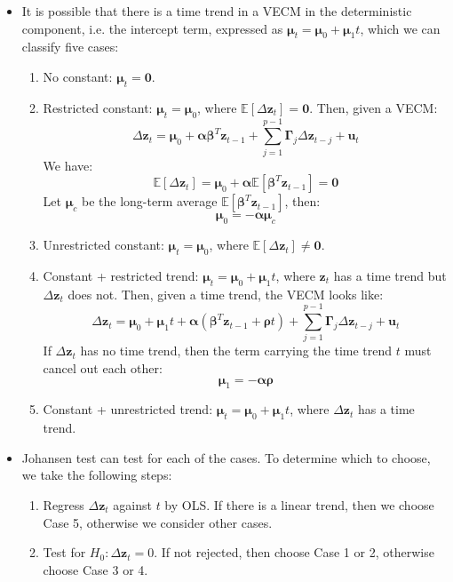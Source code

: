\documentclass[notitlepage]{article}
\begin{document}
\begin{itemize}
    \item It is possible that there is a time trend in a VECM in the deterministic component, i.e. the intercept term, expressed as \(\boldsymbol{\mu}_t = \boldsymbol{\mu}_0 + \boldsymbol{\mu}_1 t\), which we can classify five cases:
    \begin{enumerate}
        \item No constant: \(\boldsymbol{\mu}_t = \mathbf{0}\).
        \item Restricted constant: \(\boldsymbol{\mu}_t = \boldsymbol{\mu}_0\), where \(\mathbb{E}[\Delta \mathbf{z}_t] = \mathbf{0}\). Then, given a VECM:
        \[
        \Delta \mathbf{z}_t = \boldsymbol\mu_0 + \boldsymbol{\alpha}\boldsymbol{\beta}^T\mathbf{z}_{t-1} + \sum_{j=1}^{p-1}\boldsymbol{\Gamma}_{j} \Delta \mathbf{z}_{t-j} + \mathbf{u}_t
        \]
        We have:
        \[
        \mathbb{E}[\Delta \mathbf{z}_t] = \boldsymbol\mu_0 + \boldsymbol{\alpha}\mathbb{E}[\boldsymbol{\beta}^T\mathbf{z}_{t-1}] = \mathbf{0}
        \]
        Let \(\boldsymbol{\mu}_c\) be the long-term average \(\mathbb{E}[\boldsymbol{\beta}^T\mathbf{z}_{t-1}]\), then:
        \[
        \boldsymbol{\mu}_0 = -\boldsymbol{\alpha}\boldsymbol{\mu}_c
        \]
        \item Unrestricted constant: \(\boldsymbol{\mu}_t = \boldsymbol{\mu}_0\), where \(\mathbb{E}[\Delta \mathbf{z}_t] \ne \mathbf{0}\).
        \item Constant + restricted trend: \(\boldsymbol{\mu}_t = \boldsymbol{\mu}_0 + \boldsymbol{\mu}_1 t\), where \(\mathbf{z}_t\) has a time trend but \(\Delta \mathbf{z}_t\) does not. Then, given a time trend, the VECM looks like:
        \[
        \Delta \mathbf{z}_t = \boldsymbol\mu_0 + \boldsymbol{\mu}_1 t + \boldsymbol{\alpha}(\boldsymbol{\beta}^T\mathbf{z}_{t-1} + \boldsymbol{\rho}t) + \sum_{j=1}^{p-1}\boldsymbol{\Gamma}_{j} \Delta \mathbf{z}_{t-j} + \mathbf{u}_t
        \]
        If \(\Delta \mathbf{z}_t\) has no time trend, then the term carrying the time trend \(t\) must cancel out each other:
        \[
        \boldsymbol{\mu}_1 = -\boldsymbol{\alpha} \boldsymbol{\rho}
        \]
        \item Constant + unrestricted trend: \(\boldsymbol{\mu}_t = \boldsymbol{\mu}_0 + \boldsymbol{\mu}_1 t\), where \(\Delta \mathbf{z}_t\) has a time trend.
    \end{enumerate}

    \item Johansen test can test for each of the cases. To determine which to choose, we take the following steps:
    \begin{enumerate}
        \item Regress \(\Delta \mathbf{z}_t\) against \(t\) by OLS. If there is a linear trend, then we choose Case 5, otherwise we consider other cases.
        \item Test for \(H_0: \Delta \mathbf{z}_t=0\). If not rejected, then choose Case 1 or 2, otherwise choose Case 3 or 4.
    \end{enumerate}
\end{itemize}
\end{document}
